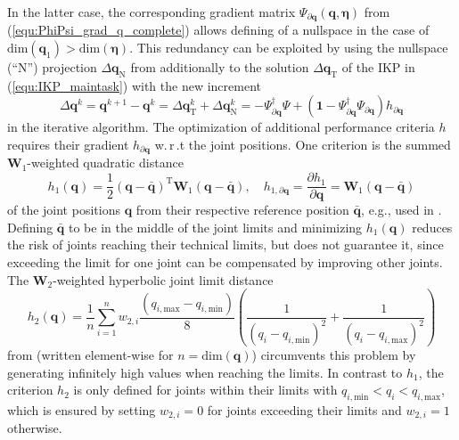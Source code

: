 \documentclass[robotics,article,accept,moreauthors,pdftex]{Definitions/mdpi}
\newcommand{\bm}[1]{\boldsymbol{#1}}
\newcommand{\transp}[0]{{\mathrm{T}}}
\let\Psi\varPsi
\begin{document}
In the latter case, the corresponding gradient matrix $\bm{\Psi}_{\partial \bm{q}}(\bm{q},\bm{\eta})$ from (\ref{equ:PhiPsi_grad_q_complete}) allows defining of a nullspace in the case of $\mathrm{dim}(\bm{q}_1)>\mathrm{dim}(\bm{\eta})$.
This redundancy can be exploited by using the nullspace (``N'') projection ${\Delta}\bm{q}_{\mathrm{N}}$ from \cite{Yoshikawa1984} additionally to the solution ${\Delta}\bm{q}_{\mathrm{T}}$ of the IKP in (\ref{equ:IKP_maintask}) with the new increment
%
\begin{equation}
{\Delta}\bm{q}^{k}
=
\bm{q}^{k+1} - \bm{q}^k
=
{\Delta}\bm{q}_{\mathrm{T}}^k + {\Delta}\bm{q}_{\mathrm{N}}^k
=
-\bm{\Psi}_{\partial\bm{q}}^{\dagger} \bm{\Psi} + (\bm{1}-\bm{\Psi}_{\partial\bm{q}}^{\dagger}\bm{\Psi}_{\partial\bm{q}}) h_{\partial\bm{q}}
\label{equ:nullspace}
\end{equation}
%
in the iterative algorithm.
The optimization of additional performance criteria $h$ requires their gradient $h_{\partial\bm{q}}$ w.\,r\,.t the joint positions.
One criterion is the summed $\bm{W}_1$-weighted quadratic distance
%
\begin{equation}
h_1(\bm{q})
=
\frac{1}{2} (\bm{q}-\bar{\bm{q}})^\transp\bm{W}_1(\bm{q}-\bar{\bm{q}}),
\quad
h_{1,\partial\bm{q}}
=
\frac{\partial h_1}{\partial \bm{q}}
=
\bm{W}_1(\bm{q}-\bar{\bm{q}})
\label{equ:criterion1}
\end{equation}
%
of the joint positions $\bm{q}$ from their respective reference position $\bar{\bm{q}}$, e.g., used in \cite{HuoBar2005,HuoBar2008}.
Defining $\bar{\bm{q}}$ to be in the middle of the joint limits and minimizing $h_1(\bm{q})$ reduces the risk of joints reaching their technical limits, but does not guarantee it, since exceeding the limit for one joint can be compensated by improving other joints.
The $\bm{W}_{2}$-weighted hyperbolic joint limit distance
%
\begin{equation}
h_2(\bm{q})
=
\frac{1}{n} \sum_{i=1}^{n}
w_{2,i}
\frac{(q_{i,\mathrm{max}}-q_{i,\mathrm{min}})}{8}
\left(
\frac{1}{(q_{i}-q_{i,\mathrm{min}})^2}
+
\frac{1}{(q_{i}-q_{i,\mathrm{max}})^2}
\right)
\label{equ:criterion2}
\end{equation}
%
from \cite{ZhuQuCaoYan2013} (written element-wise for $n=\mathrm{dim}(\bm{q})$) circumvents this problem by generating infinitely high values when reaching the limits.
In contrast to $h_1$, the criterion $h_2$ is only defined for joints within their limits with $q_{i,\mathrm{min}} < q_i < q_{i,\mathrm{max}}$, which is ensured by setting $w_{2,i}=0$ for joints exceeding their limits and $w_{2,i}=1$ otherwise.
\end{document}
